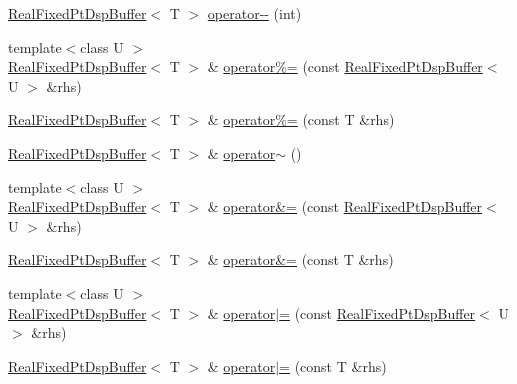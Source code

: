\begin{DoxyCompactItemize}
\item 
\hyperlink{class_smart_dsp_1_1_real_fixed_pt_dsp_buffer}{Real\+Fixed\+Pt\+Dsp\+Buffer}$<$ T $>$ \hyperlink{class_smart_dsp_1_1_real_fixed_pt_dsp_buffer_a35ad28b40e01e70a2b3df7632db29dbe}{operator-\/-\/} (int)
\item 
{\footnotesize template$<$class U $>$ }\\\hyperlink{class_smart_dsp_1_1_real_fixed_pt_dsp_buffer}{Real\+Fixed\+Pt\+Dsp\+Buffer}$<$ T $>$ \& \hyperlink{class_smart_dsp_1_1_real_fixed_pt_dsp_buffer_a5975e80a29a4e2cc4fb9e40f888e2ba5}{operator\%=} (const \hyperlink{class_smart_dsp_1_1_real_fixed_pt_dsp_buffer}{Real\+Fixed\+Pt\+Dsp\+Buffer}$<$ U $>$ \&rhs)
\item 
\hyperlink{class_smart_dsp_1_1_real_fixed_pt_dsp_buffer}{Real\+Fixed\+Pt\+Dsp\+Buffer}$<$ T $>$ \& \hyperlink{class_smart_dsp_1_1_real_fixed_pt_dsp_buffer_a75b899c29ce4f717088e0ead1f381356}{operator\%=} (const T \&rhs)
\item 
\hyperlink{class_smart_dsp_1_1_real_fixed_pt_dsp_buffer}{Real\+Fixed\+Pt\+Dsp\+Buffer}$<$ T $>$ \& \hyperlink{class_smart_dsp_1_1_real_fixed_pt_dsp_buffer_aedaa0814160c15898bd95d27aa5b39d3}{operator$\sim$} ()
\item 
{\footnotesize template$<$class U $>$ }\\\hyperlink{class_smart_dsp_1_1_real_fixed_pt_dsp_buffer}{Real\+Fixed\+Pt\+Dsp\+Buffer}$<$ T $>$ \& \hyperlink{class_smart_dsp_1_1_real_fixed_pt_dsp_buffer_a65c8caae202586ced532eda353a3769c}{operator\&=} (const \hyperlink{class_smart_dsp_1_1_real_fixed_pt_dsp_buffer}{Real\+Fixed\+Pt\+Dsp\+Buffer}$<$ U $>$ \&rhs)
\item 
\hyperlink{class_smart_dsp_1_1_real_fixed_pt_dsp_buffer}{Real\+Fixed\+Pt\+Dsp\+Buffer}$<$ T $>$ \& \hyperlink{class_smart_dsp_1_1_real_fixed_pt_dsp_buffer_a44205d17e56c6aab520b6c3ede332f86}{operator\&=} (const T \&rhs)
\item 
{\footnotesize template$<$class U $>$ }\\\hyperlink{class_smart_dsp_1_1_real_fixed_pt_dsp_buffer}{Real\+Fixed\+Pt\+Dsp\+Buffer}$<$ T $>$ \& \hyperlink{class_smart_dsp_1_1_real_fixed_pt_dsp_buffer_abb91aac2de8fb64f2212f8b1f4d10749}{operator$\vert$=} (const \hyperlink{class_smart_dsp_1_1_real_fixed_pt_dsp_buffer}{Real\+Fixed\+Pt\+Dsp\+Buffer}$<$ U $>$ \&rhs)
\item 
\hyperlink{class_smart_dsp_1_1_real_fixed_pt_dsp_buffer}{Real\+Fixed\+Pt\+Dsp\+Buffer}$<$ T $>$ \& \hyperlink{class_smart_dsp_1_1_real_fixed_pt_dsp_buffer_a433746a971e30e5e622057ea6460b704}{operator$\vert$=} (const T \&rhs)

\end{DoxyCompactItemize}
